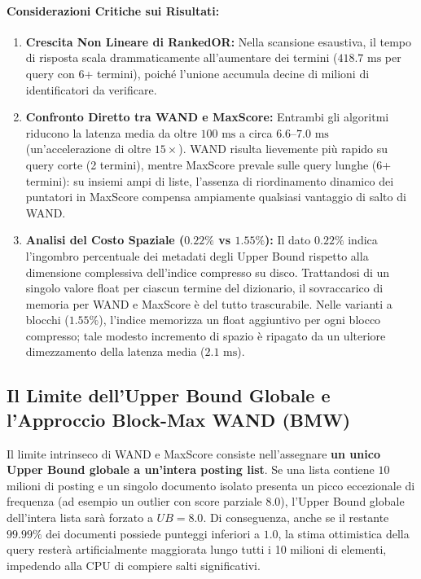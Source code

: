 \paragraph{Considerazioni Critiche sui Risultati:}
\begin{enumerate}
    \item \textbf{Crescita Non Lineare di RankedOR:} Nella scansione esaustiva, il tempo di risposta scala drammaticamente all'aumentare dei termini ($418.7\text{ ms}$ per query con 6+ termini), poich\'e l'unione accumula decine di milioni di identificatori da verificare.
    \item \textbf{Confronto Diretto tra WAND e MaxScore:} Entrambi gli algoritmi riducono la latenza media da oltre $100\text{ ms}$ a circa $6.6\text{--}7.0\text{ ms}$ (un'accelerazione di oltre $15\times$). WAND risulta lievemente pi\`u rapido su query corte (2 termini), mentre MaxScore prevale sulle query lunghe (6+ termini): su insiemi ampi di liste, l'assenza di riordinamento dinamico dei puntatori in MaxScore compensa ampiamente qualsiasi vantaggio di salto di WAND.
    \item \textbf{Analisi del Costo Spaziale ($0.22\%$ vs $1.55\%$):} Il dato $0.22\%$ indica l'ingombro percentuale dei metadati degli Upper Bound rispetto alla dimensione complessiva dell'indice compresso su disco. Trattandosi di un singolo valore float per ciascun termine del dizionario, il sovraccarico di memoria per WAND e MaxScore \`e del tutto trascurabile. Nelle varianti a blocchi ($1.55\%$), l'indice memorizza un float aggiuntivo per ogni blocco compresso; tale modesto incremento di spazio \`e ripagato da un ulteriore dimezzamento della latenza media ($2.1\text{ ms}$).
\end{enumerate}

\FloatBarrier
\subsection{Il Limite dell'Upper Bound Globale e l'Approccio Block-Max WAND (BMW)}
Il limite intrinseco di WAND e MaxScore consiste nell'assegnare \textbf{un unico Upper Bound globale a un'intera posting list}.  
Se una lista contiene $10$ milioni di posting e un singolo documento isolato presenta un picco eccezionale di frequenza (ad esempio un outlier con score parziale $8.0$), l'Upper Bound globale dell'intera lista sar\`a forzato a $UB = 8.0$. Di conseguenza, anche se il restante $99.99\%$ dei documenti possiede punteggi inferiori a $1.0$, la stima ottimistica della query rester\`a artificialmente maggiorata lungo tutti i 10 milioni di elementi, impedendo alla CPU di compiere salti significativi.

